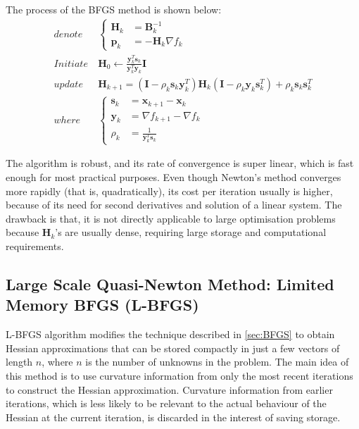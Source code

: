 The process of the BFGS method is shown below:
\begin{align}
  denote   & \                       \left\{
  \begin{array}{ll}
    \textbf{H}_k & = \textbf{B}_k^{-1}          \\
    \textbf{p}_k & = -\textbf{H}_k \nabla f_{k}
  \end{array}
  \right.                                                                                                                                                                                                        \\
  Initiate & \ \textbf{H}_0     \leftarrow \frac{\textbf{y}_k^T\textbf{s}_k}{\textbf{y}_k^T\textbf{y}_k}\textbf{I}                                                           \label{eq:BFGS_initiate_H_0}        \\
  update   & \ \textbf{H}_{k+1}  = (\textbf{I} - \rho_k\textbf{s}_k\textbf{y}_k^T) \textbf{H}_{k} (\textbf{I} - \rho_k\textbf{y}_k\textbf{s}_k^T) +\rho_k\textbf{s}_k\textbf{s}_k^T \label{eq:BFGS_update_H_k+1} \\
  where    & \                        \left\{
  \begin{array}{ll}
    \textbf{s}_k & = \textbf{x}_{k+1} - \textbf{x}_{k}                               \\
    \textbf{y}_k & = \nabla f_{k+1} - \nabla f_{k}                                   \\
    \rho_k       & = \frac{1}{\textbf{y}_k^T\textbf{s}_k} \label{eq:BFGS_calc_rho_k}
  \end{array}
  \right.
\end{align}

The algorithm is robust, and its rate of convergence is super linear, which is fast enough for most practical purposes. Even though Newton's method converges more rapidly (that is, quadratically), its cost per iteration usually is higher, because of its need for second derivatives and solution of a linear system. The drawback is that, it is not directly applicable to large optimisation problems because $\textbf{H}_k$'s are usually dense, requiring large storage and computational requirements. \cite{Nocedal2006}



\subsection{Large Scale Quasi-Newton Method: Limited Memory BFGS (L-BFGS)}\label{sec:L-BFGS}
L-BFGS algorithm \cite{Liu1989} modifies the technique described in \cref{sec:BFGS} to obtain Hessian approximations that can be stored compactly in just a few vectors of length $n$, where $n$ is the number of unknowns in the problem. The main idea of this method is to use curvature information from only the most recent iterations to construct the Hessian approximation. Curvature information from earlier iterations, which is less likely to be relevant to the actual behaviour of the Hessian at the current iteration, is discarded in the interest of saving storage. \cite{Nocedal2006}


